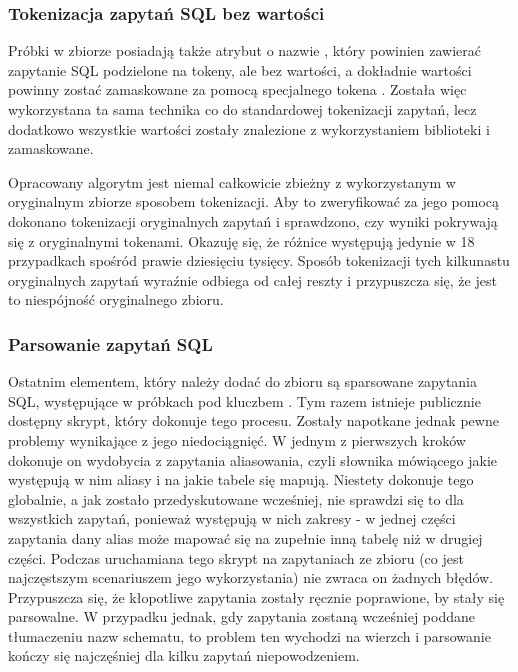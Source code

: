 \subsubsection{Tokenizacja zapytań SQL bez wartości}
Próbki w zbiorze  posiadają także atrybut o nazwie , który powinien zawierać zapytanie SQL podzielone na tokeny, ale bez wartości, a dokładnie wartości powinny zostać zamaskowane za pomocą specjalnego tokena . Została więc wykorzystana ta sama technika co do standardowej tokenizacji zapytań, lecz dodatkowo wszystkie wartości zostały znalezione z wykorzystaniem biblioteki  i zamaskowane.

Opracowany algorytm jest niemal całkowicie zbieżny z wykorzystanym w oryginalnym zbiorze  sposobem tokenizacji. Aby to zweryfikować za jego pomocą dokonano tokenizacji oryginalnych zapytań i sprawdzono, czy wyniki pokrywają się z oryginalnymi tokenami. Okazuję się, że różnice występują jedynie w 18 przypadkach spośród prawie dziesięciu tysięcy. Sposób tokenizacji tych kilkunastu oryginalnych zapytań wyraźnie odbiega od całej reszty i przypuszcza się, że jest to niespójność oryginalnego zbioru. 

\subsubsection{Parsowanie zapytań SQL}
Ostatnim elementem, który należy dodać do zbioru są sparsowane zapytania SQL, występujące w próbkach pod kluczbem . Tym razem istnieje publicznie dostępny skrypt, który dokonuje tego procesu. Zostały napotkane jednak pewne problemy wynikające z jego niedociągnięć. W jednym z pierwszych kroków dokonuje on wydobycia z zapytania aliasowania, czyli słownika mówiącego jakie występują w nim aliasy i na jakie tabele się mapują. Niestety dokonuje tego globalnie, a jak zostało przedyskutowane wcześniej, nie sprawdzi się to dla wszystkich zapytań, ponieważ występują w nich zakresy - w jednej części zapytania dany alias może mapować się na zupełnie inną tabelę niż w drugiej części. Podczas uruchamiana tego skrypt na zapytaniach ze zbioru  (co jest najczęstszym scenariuszem jego wykorzystania) nie zwraca on żadnych błędów. Przypuszcza się, że kłopotliwe zapytania zostały ręcznie poprawione, by stały się parsowalne. W przypadku jednak, gdy zapytania zostaną wcześniej poddane tłumaczeniu nazw schematu, to problem ten wychodzi na wierzch i parsowanie kończy się najczęśniej dla kilku zapytań niepowodzeniem. 

